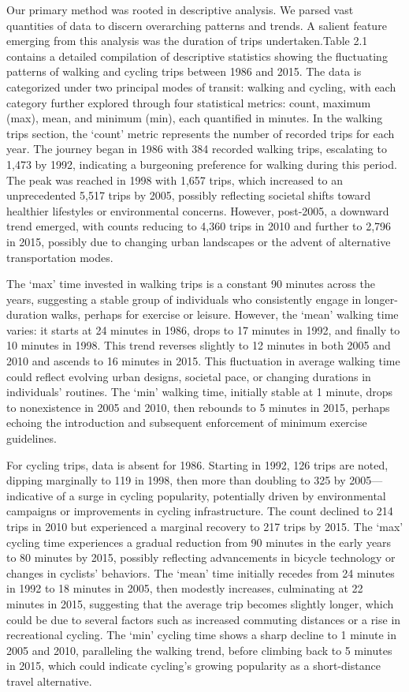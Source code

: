 \documentclass[12pt,twoside]{reedthesis}
\begin{document}
Our primary method was rooted in descriptive analysis. We parsed vast quantities of data to discern overarching patterns and trends. A salient feature emerging from this analysis was the duration of trips undertaken.Table 2.1 contains a detailed compilation of descriptive statistics showing the fluctuating patterns of walking and cycling trips between 1986 and 2015. The data is categorized under two principal modes of transit: walking and cycling, with each category further explored through four statistical metrics: count, maximum (max), mean, and minimum (min), each quantified in minutes. In the walking trips section, the `count' metric represents the number of recorded trips for each year. The journey began in 1986 with 384 recorded walking trips, escalating to 1,473 by 1992, indicating a burgeoning preference for walking during this period. The peak was reached in 1998 with 1,657 trips, which increased to an unprecedented 5,517 trips by 2005, possibly reflecting societal shifts toward healthier lifestyles or environmental concerns. However, post-2005, a downward trend emerged, with counts reducing to 4,360 trips in 2010 and further to 2,796 in 2015, possibly due to changing urban landscapes or the advent of alternative transportation modes.

The `max' time invested in walking trips is a constant 90 minutes across the years, suggesting a stable group of individuals who consistently engage in longer-duration walks, perhaps for exercise or leisure. However, the `mean' walking time varies: it starts at 24 minutes in 1986, drops to 17 minutes in 1992, and finally to 10 minutes in 1998. This trend reverses slightly to 12 minutes in both 2005 and 2010 and ascends to 16 minutes in 2015. This fluctuation in average walking time could reflect evolving urban designs, societal pace, or changing durations in individuals' routines. The `min' walking time, initially stable at 1 minute, drops to nonexistence in 2005 and 2010, then rebounds to 5 minutes in 2015, perhaps echoing the introduction and subsequent enforcement of minimum exercise guidelines.

For cycling trips, data is absent for 1986. Starting in 1992, 126 trips are noted, dipping marginally to 119 in 1998, then more than doubling to 325 by 2005---indicative of a surge in cycling popularity, potentially driven by environmental campaigns or improvements in cycling infrastructure. The count declined to 214 trips in 2010 but experienced a marginal recovery to 217 trips by 2015. The `max' cycling time experiences a gradual reduction from 90 minutes in the early years to 80 minutes by 2015, possibly reflecting advancements in bicycle technology or changes in cyclists' behaviors. The `mean' time initially recedes from 24 minutes in 1992 to 18 minutes in 2005, then modestly increases, culminating at 22 minutes in 2015, suggesting that the average trip becomes slightly longer, which could be due to several factors such as increased commuting distances or a rise in recreational cycling. The `min' cycling time shows a sharp decline to 1 minute in 2005 and 2010, paralleling the walking trend, before climbing back to 5 minutes in 2015, which could indicate cycling's growing popularity as a short-distance travel alternative.
\end{document}
